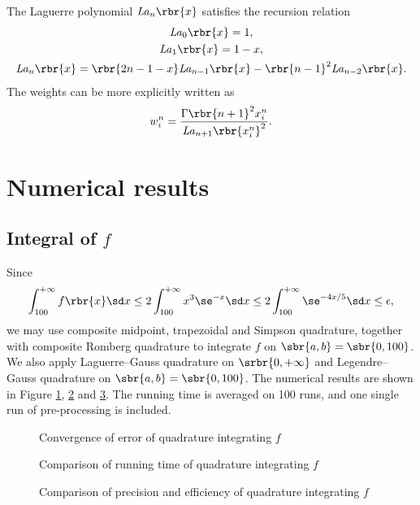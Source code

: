 \documentclass[english, nochinese]{pnote}
\begin{document}
The Laguerre polynomial $ \mathit{La}_n \rbr{x} $ satisfies the recursion relation
\begin{gather}
\mathit{La}_0 \rbr{x} = 1, \\
\mathit{La}_1 \rbr{x} = 1 - x, \\
\mathit{La}_n \rbr{x} = \rbr{ 2 n - 1 - x } \mathit{La}_{ n - 1 } \rbr{x} - \rbr{ n - 1 }^2 \mathit{La}_{ n - 2 } \rbr{x}.
\end{gather}
The weights can be more explicitly written as
\begin{equation}
w_i^n = \frac{ \Gamma \rbr{ n + 1 }^2 x_i^n }{ \mathit{La}_{ n + 1 } \rbr{x_i^n}^2 }.
\end{equation}

\section{Numerical results}

\subsection{Integral of $f$}

Since
\begin{equation}
\int_{100}^{+\infty} f \rbr{x} \sd x \le 2 \int_{100}^{+\infty} x^3 \se^{-x} \sd x \le 2 \int_{100}^{+\infty} \se^{ -4 x / 5 } \sd x \le \epsilon,
\end{equation}
we may use composite midpoint, trapezoidal and Simpson quadrature, together with composite Romberg quadrature to integrate $f$ on $ \sbr{ a, b } = \sbr{ 0, 100 } $. We also apply Laguerre--Gauss quadrature on $ \srbr{ 0, +\infty } $ and Legendre--Gauss quadrature on $ \sbr{ a, b } = \sbr{ 0, 100 } $. The numerical results are shown in Figure \ref{Fig:FError}, \ref{Fig:FTime} and \ref{Fig:FErrorTime}. The running time is averaged on 100 runs, and one single run of pre-processing is included.

\begin{figure}
\centering
\scalebox{0.70}{}
\caption{Convergence of error of quadrature integrating $f$}
\label{Fig:FError}
\end{figure}

\begin{figure}
\centering
\scalebox{0.70}{}
\caption{Comparison of running time of quadrature integrating $f$}
\label{Fig:FTime}
\end{figure}

\begin{figure}
\centering
\scalebox{0.70}{}
\caption{Comparison of precision and efficiency of quadrature integrating $f$}
\label{Fig:FErrorTime}
\end{figure}
\end{document}
